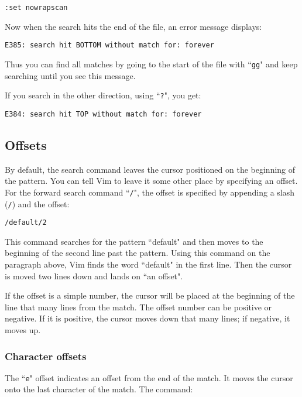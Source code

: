 \begin{Verbatim}[samepage=true]
 :set nowrapscan
\end{Verbatim}

Now when the search hits the end of the file, an error message displays:

\begin{Verbatim}[samepage=true]
    E385: search hit BOTTOM without match for: forever 
\end{Verbatim}

Thus you can find all matches by going to the start of the file with ``\texttt{gg}" and keep searching until you see this message.

If you search in the other direction, using ``\texttt{?}", you get:

\begin{Verbatim}[samepage=true]
    E384: search hit TOP without match for: forever 
\end{Verbatim}
\subsection{Offsets}
By default, the search command leaves the cursor positioned on the beginning of the pattern.
You can tell Vim to leave it some other place by specifying an offset.
For the forward search command ``\texttt{/}", the offset is specified by appending a slash (\texttt{/}) and the offset:

\begin{Verbatim}[samepage=true]
 /default/2
\end{Verbatim}

This command searches for the pattern ``default" and then moves to the beginning of the second line past the pattern.
Using this command on the paragraph above, Vim finds the word ``default" in the first line.
Then the cursor is moved two lines down and lands on ``an offset".

If the offset is a simple number, the cursor will be placed at the beginning of the line that many lines from the match.
The offset number can be positive or negative.
If it is positive, the cursor moves down that many lines; if negative, it moves up.

\subsubsection{Character offsets}
The ``\texttt{e}" offset indicates an offset from the end of the match.
It moves the cursor onto the last character of the match.
The command:

